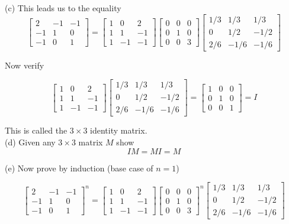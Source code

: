 \documentclass[16 pt]{amsart}
\theoremstyle{definition}
\theoremstyle{remark}
\numberwithin{equation}{subsection}
\begin{document}
(c) This leads us to the equality
\[
\begin{bmatrix}
2 & -1 & -1 \\
-1 & 1 & 0\\
-1 & 0 & 1
\end{bmatrix} = 
\begin{bmatrix}
1 & 0 & 2 \\
1 & 1 & -1\\
1 & -1 & -1
\end{bmatrix}
\begin{bmatrix}
0 & 0 & 0 \\
0 & 1 & 0\\
0 & 0 & 3
\end{bmatrix}
\begin{bmatrix}
1/3 & 1/3 & 1/3 \\
0 & 1/2 & -1/2\\
2/6 & -1/6 & -1/6
\end{bmatrix}
\]


Now verify

\[
\begin{bmatrix}
1 & 0 & 2 \\
1 & 1 & -1\\
1 & -1 & -1
\end{bmatrix}
\begin{bmatrix}
1/3 & 1/3 & 1/3 \\
0 & 1/2 & -1/2\\
2/6 & -1/6 & -1/6
\end{bmatrix}
=
\begin{bmatrix}
1 & 0 & 0\\
0 & 1 & 0\\
0 & 0 & 1
\end{bmatrix} = I
\]


This is called the $3\times 3$ identity matrix.\\

  

(d) Given any $3\times 3$ matrix $M$ show
\[
IM = MI = M
\]

(e) Now prove by induction (base case of $n=1$)

\[
\begin{bmatrix}
2 & -1 & -1 \\
-1 & 1 & 0\\
-1 & 0 & 1
\end{bmatrix}^n = 
\begin{bmatrix}
1 & 0 & 2 \\
1 & 1 & -1\\
1 & -1 & -1
\end{bmatrix}
\begin{bmatrix}
0 & 0 & 0 \\
0 & 1 & 0\\
0 & 0 & 3
\end{bmatrix}^n
\begin{bmatrix}
1/3 & 1/3 & 1/3 \\
0 & 1/2 & -1/2\\
2/6 & -1/6 & -1/6
\end{bmatrix}
\]
\end{document}
